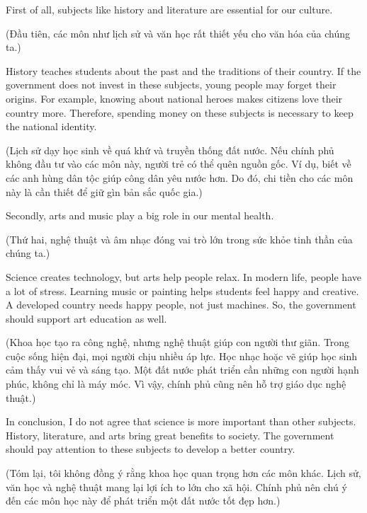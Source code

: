 \documentclass{../templateWriting/cdwriting}
\begin{document}

First of all, subjects like history and literature are essential for our culture.

(Đầu tiên, các môn như lịch sử và văn học rất thiết yếu cho văn hóa của chúng ta.)

History teaches students about the past and the traditions of their country. If the government does not invest in these subjects, young people may forget their origins. For example, knowing about national heroes makes citizens love their country more. Therefore, spending money on these subjects is necessary to keep the national identity.

(Lịch sử dạy học sinh về quá khứ và truyền thống đất nước. Nếu chính phủ không đầu tư vào các môn này, người trẻ có thể quên nguồn gốc. Ví dụ, biết về các anh hùng dân tộc giúp công dân yêu nước hơn. Do đó, chi tiền cho các môn này là cần thiết để giữ gìn bản sắc quốc gia.)


Secondly, arts and music play a big role in our mental health.

(Thứ hai, nghệ thuật và âm nhạc đóng vai trò lớn trong sức khỏe tinh thần của chúng ta.)

Science creates technology, but arts help people relax. In modern life, people have a lot of stress. Learning music or painting helps students feel happy and creative. A developed country needs happy people, not just machines. So, the government should support art education as well.

(Khoa học tạo ra công nghệ, nhưng nghệ thuật giúp con người thư giãn. Trong cuộc sống hiện đại, mọi người chịu nhiều áp lực. Học nhạc hoặc vẽ giúp học sinh cảm thấy vui vẻ và sáng tạo. Một đất nước phát triển cần những con người hạnh phúc, không chỉ là máy móc. Vì vậy, chính phủ cũng nên hỗ trợ giáo dục nghệ thuật.)


In conclusion, I do not agree that science is more important than other subjects. History, literature, and arts bring great benefits to society. The government should pay attention to these subjects to develop a better country.

(Tóm lại, tôi không đồng ý rằng khoa học quan trọng hơn các môn khác. Lịch sử, văn học và nghệ thuật mang lại lợi ích to lớn cho xã hội. Chính phủ nên chú ý đến các môn học này để phát triển một đất nước tốt đẹp hơn.)
\end{document}
